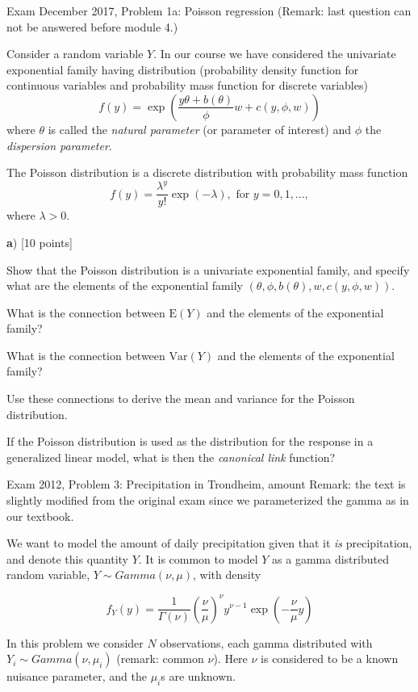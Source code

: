 \documentclass[
  ignorenonframetext,
]{beamer}
\begin{document}
\begin{frame}
\begin{block}{Exam December 2017, Problem 1a: Poisson regression}
\label{exam-december-2017-problem-1a-poisson-regression}
(Remark: last question can not be answered before module 4.)

Consider a random variable \(Y\). In our course we have considered the
univariate exponential family having distribution (probability density
function for continuous variables and probability mass function for
discrete variables)
\[ f(y)=\exp(\frac{y \theta +b(\theta)}{\phi}w + c(y,\phi,w))\] where
\(\theta\) is called the \emph{natural parameter} (or parameter of
interest) and \(\phi\) the \emph{dispersion parameter}.

The Poisson distribution is a discrete distribution with probability
mass function
\[ f(y)=\frac{\lambda^{y}}{y!}\exp(- \lambda), \text{ for } y=0,1,...,\]
where \(\lambda>0\).
\end{block}
\end{frame}

\begin{frame}
\textbf{a}) {[}10 points{]}

Show that the Poisson distribution is a univariate exponential family,
and specify what are the elements of the exponential family
\((\theta,\phi,b(\theta),w,c(y,\phi,w))\).

What is the connection between \(\text{E}(Y)\) and the elements of the
exponential family?

What is the connection between \(\text{Var}(Y)\) and the elements of the
exponential family?

Use these connections to derive the mean and variance for the Poisson
distribution.

If the Poisson distribution is used as the distribution for the response
in a generalized linear model, what is then the \emph{canonical link}
function?
\end{frame}

\begin{frame}
\begin{block}{Exam 2012, Problem 3: Precipitation in Trondheim, amount}
\label{exam-2012-problem-3-precipitation-in-trondheim-amount}
Remark: the text is slightly modified from the original exam since we
parameterized the gamma as in our textbook.

We want to model the amount of daily precipitation given that it
\emph{is} precipitation, and denote this quantity \(Y\). It is common to
model \(Y\) as a gamma distributed random variable,
\(Y \sim Gamma(\nu,\mu)\), with density

\[ f_Y(y) = \frac{1}{\Gamma(\nu)} \left(\frac{\nu}{\mu}\right)^{\nu} y^{\nu-1}\exp\left(-\frac{\nu}{\mu} y \right) \]

In this problem we consider \(N\) observations, each gamma distributed
with \(Y_i \sim Gamma(\nu, \mu_i)\) (remark: common \(\nu\)). Here
\(\nu\) is considered to be a known nuisance parameter, and the
\(\mu_i\)s are unknown.
\end{block}
\end{frame}
\end{document}
